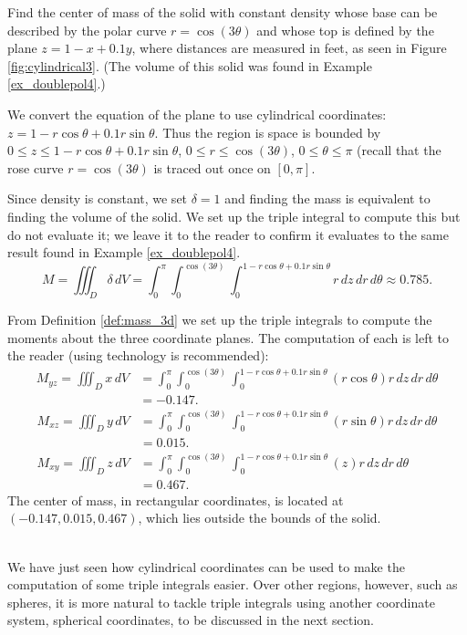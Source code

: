 {Find the center of mass of the solid with constant density whose base can be described by the polar curve $r=\cos(3\theta)$ and whose top is defined by the plane $z=1-x+0.1y$, where distances are measured in feet, as seen in Figure \ref{fig:cylindrical3}. (The volume of this solid was found in Example \ref{ex_doublepol4}.)
}
{We convert the equation of the plane to use cylindrical coordinates: $z= 1-r\cos\theta+0.1r\sin\theta$. Thus the region is space is bounded by $0 \leq z \leq 1-r\cos\theta + 0.1r\sin\theta$, $0 \leq r \leq \cos(3\theta)$, $0 \leq \theta \leq \pi$ (recall that the rose curve $r=\cos(3\theta)$ is traced out once on $[0,\pi]$.

Since density is constant, we set $\delta = 1$ and finding the mass is equivalent to finding the volume of the solid. We set up the triple integral to compute this but do not evaluate it; we leave it to the reader to confirm it evaluates to the same result found in Example \ref{ex_doublepol4}.
$$M = \iiint_D\delta \, dV = \int_0^{\pi}\int_0^{\cos(3\theta)}\int_0^{1-r\cos\theta+0.1r\sin\theta} r\,dz\,dr\,d\theta \approx 0.785.$$

From Definition \ref{def:mass_3d} we set up the triple integrals to compute the moments about the three coordinate planes. The computation of each is left to the reader (using technology is recommended):
\begin{align*}
M_{yz} = \iiint_D x\,dV &= \int_0^{\pi}\int_0^{\cos(3\theta)}\int_0^{1-r\cos\theta+0.1r\sin\theta} (r\cos\theta) r\,dz\,dr\,d\theta\\
&= -0.147.
\end{align*}
\begin{align*}
M_{xz} = \iiint_D y\,dV &= \int_0^{\pi}\int_0^{\cos(3\theta)}\int_0^{1-r\cos\theta+0.1r\sin\theta} (r\sin\theta) r\,dz\,dr\,d\theta\\
&= 0.015.\\
M_{xy} = \iiint_D z\,dV &= \int_0^{\pi}\int_0^{\cos(3\theta)}\int_0^{1-r\cos\theta+0.1r\sin\theta} (z) r\,dz\,dr\,d\theta\\
 &= 0.467.
\end{align*}
The center of mass, in rectangular coordinates,  is located at $(-0.147,0.015,0.467)$, which lies outside the bounds of the solid.
}\\

We have just seen how cylindrical coordinates can be used to make the computation of some triple integrals easier.  Over other regions, however, such as spheres, it is more natural to tackle triple integrals using another coordinate system, spherical coordinates, to be discussed in the next section.




